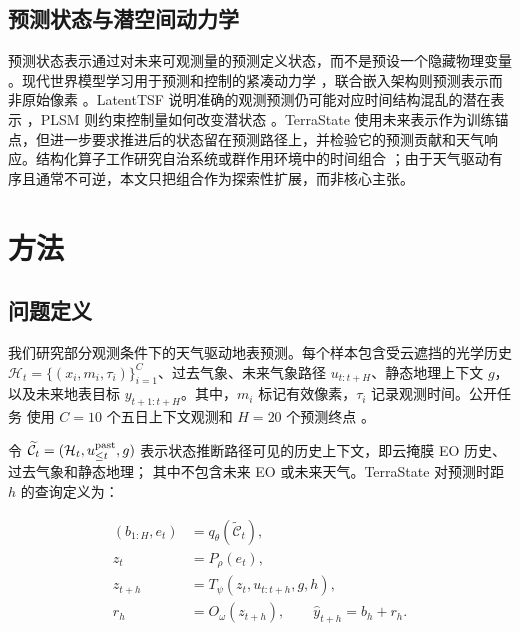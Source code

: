\documentclass[11pt,a4paper,fontset=fandol]{ctexart}
\begin{document}
\subsection{预测状态与潜空间动力学}

预测状态表示通过对未来可观测量的预测定义状态，而不是预设一个隐藏物理变量 \cite{littman2001predictive}。现代世界模型学习用于预测和控制的紧凑动力学 \cite{ha2018worldmodels,hafner2019planet,hafner2020dreamer}，联合嵌入架构则预测表示而非原始像素 \cite{assran2023ijepa,bardes2024vjepa}。LatentTSF 说明准确的观测预测仍可能对应时间结构混乱的潜在表示 \cite{yang2026latenttsf}，PLSM 则约束控制量如何改变潜状态 \cite{saanum2024simplifying}。TerraState 使用未来表示作为训练锚点，但进一步要求推进后的状态留在预测路径上，并检验它的预测贡献和天气响应。结构化算子工作研究自治系统或群作用环境中的时间组合 \cite{chen2023deeposg,wang2026groupactions}；由于天气驱动有序且通常不可逆，本文只把组合作为探索性扩展，而非核心主张。

\section{方法}

\subsection{问题定义}

我们研究部分观测条件下的天气驱动地表预测。每个样本包含受云遮挡的光学历史 $\mathcal H_t=\{(x_i,m_i,\tau_i)\}_{i=1}^{C}$、过去气象、未来气象路径 $u_{t:t+H}$、静态地理上下文 $g$，以及未来地表目标 $y_{t+1:t+H}$。其中，$m_i$ 标记有效像素，$\tau_i$ 记录观测时间。公开任务 使用 $C=10$ 个五日上下文观测和 $H=20$ 个预测终点 \cite{benson2024multimodal}。

令 $\widetilde{\mathcal C}_t=(\mathcal H_t,u_{\leq t}^{\rm past},g)$ 表示状态推断路径可见的历史上下文，即云掩膜 EO 历史、过去气象和静态地理； 其中不包含未来 EO 或未来天气。TerraState 对预测时距 $h$ 的查询定义为：

\begin{equation*}
\begin{aligned}
(b_{1:H},e_t)&=q_\theta(\widetilde{\mathcal C}_t),\\
z_t&=P_\rho(e_t),\\
z_{t+h}&=T_\psi(z_t,u_{t:t+h},g,h),\\
r_h&=O_\omega(z_{t+h}),\qquad
\widehat y_{t+h}=b_h+r_h .
\end{aligned}
\tag{1}
\end{equation*}
\end{document}
